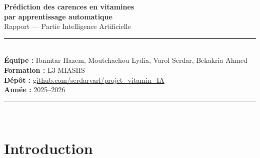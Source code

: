 \documentclass[12pt,a4paper]{article}
\begin{document}
\begin{titlepage}
    \centering
    \vspace*{2cm}
    {\LARGE\bfseries\color{bleu}
        Prédiction des carences en vitamines\\[0.4em]
        par apprentissage automatique}\\[2cm]
    {\large Rapport --- Partie Intelligence Artificielle}\\[1.5cm]
    \rule{\linewidth}{0.5pt}\\[1cm]
    {\normalsize
        \textbf{Équipe :} Ibnmtar Hazem, Moutchachou Lydia, Varol Serdar, Bekakria Ahmed\\[0.5em]
        \textbf{Formation :} L3 MIASHS\\[0.5em]
        \textbf{Dépôt :} \href{https://github.com/serdarvarl/projet_vitamin_IA}%
            {github.com/serdarvarl/projet\_vitamin\_IA}\\[0.5em]
        \textbf{Année :} 2025--2026
    }\\[1cm]
    \rule{\linewidth}{0.5pt}\\[2cm]
    \begin{abstract}
        \noindent
        Ce rapport présente la conception et l'évaluation d'un système de
        classification automatique des carences en vitamines à partir de données
        cliniques, biologiques et comportementales de patients.
        Trois algorithmes ont été comparés --- forêt aléatoire, SVM et k-NN ---
        sur un jeu de données fortement déséquilibré (ratio 15,9:1, $n=4\,000$).
        Une étude d'ablation à quatre dimensions a permis d'identifier que
        les biomarqueurs sériques sont indispensables ($-$17,4\,\% F1 sans eux)
        tandis que les variables lifestyle, souvent écartées a priori, apportent
        un gain significatif ($+$5,3\,\% F1).
        La configuration finale --- forêt aléatoire sur 30 variables avec SMOTE et
        normalisation --- est évaluée sur un \emph{holdout} propre (30\,\%, jamais vu)
        et atteint \textbf{94,06\,\% F1 pondéré} (94,00\,\% d'exactitude),
        dont une détection parfaite du scorbut (F1 = 1,00).
    \end{abstract}
\end{titlepage}

\tableofcontents
\newpage

\section{Introduction}
\end{document}
